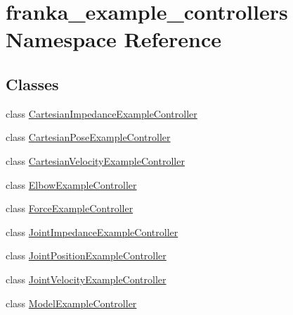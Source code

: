 \hypertarget{namespacefranka__example__controllers}{}\section{franka\+\_\+example\+\_\+controllers Namespace Reference}
\label{namespacefranka__example__controllers}
\subsection*{Classes}
\begin{DoxyCompactItemize}
\item 
class \hyperlink{classfranka__example__controllers_1_1CartesianImpedanceExampleController}{Cartesian\+Impedance\+Example\+Controller}
\item 
class \hyperlink{classfranka__example__controllers_1_1CartesianPoseExampleController}{Cartesian\+Pose\+Example\+Controller}
\item 
class \hyperlink{classfranka__example__controllers_1_1CartesianVelocityExampleController}{Cartesian\+Velocity\+Example\+Controller}
\item 
class \hyperlink{classfranka__example__controllers_1_1ElbowExampleController}{Elbow\+Example\+Controller}
\item 
class \hyperlink{classfranka__example__controllers_1_1ForceExampleController}{Force\+Example\+Controller}
\item 
class \hyperlink{classfranka__example__controllers_1_1JointImpedanceExampleController}{Joint\+Impedance\+Example\+Controller}
\item 
class \hyperlink{classfranka__example__controllers_1_1JointPositionExampleController}{Joint\+Position\+Example\+Controller}
\item 
class \hyperlink{classfranka__example__controllers_1_1JointVelocityExampleController}{Joint\+Velocity\+Example\+Controller}
\item 
class \hyperlink{classfranka__example__controllers_1_1ModelExampleController}{Model\+Example\+Controller}
\end{DoxyCompactItemize}
